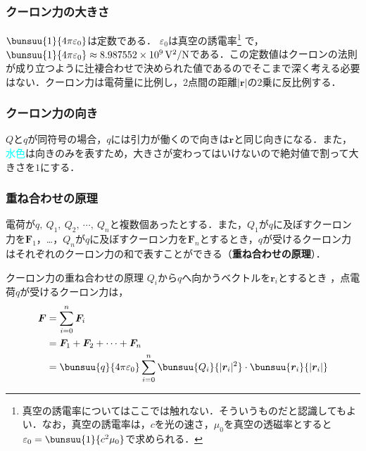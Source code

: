 \subsubsection*{クーロン力の大きさ}

$\bunsuu{1}{4\pi\varepsilon_0}$は定数である．
$\varepsilon_0$は真空の誘電率\footnote{真空の誘電率についてはここでは触れない．そういうものだと認識してもよい．なお，真空の誘電率は，$c$を光の速さ，$\mu_0$を真空の透磁率とすると$\varepsilon_0 = \bunsuu{1}{c^2\mu_0}$で求められる．} で，
$\bunsuu{1}{4\pi\varepsilon_0} \approx 8.987552 \times 10^9\, \mathrm{V^2 / N}$である．この定数値はクーロンの法則が成り立つように辻褄合わせで決められた値であるのでそこまで深く考える必要はない．クーロン力は電荷量に比例し，2点間の距離$|\bm{r}|$の2乗に反比例する．



\subsubsection*{クーロン力の向き}

$Q$と$q$が同符号の場合，$q$には引力が働くので向きは$\bm{r}$と同じ向きになる．また，\textcolor{cyan}{水色}は向きのみを表すため，大きさが変わってはいけないので絶対値で割って大きさを$1$にする．



\subsubsection*{重ね合わせの原理}

電荷が$q,\ Q_1,\ Q_2,\ \cdots,\ Q_n$と複数個あったとする．また，$Q_1$が$q$に及ぼすクーロン力を$\bm{F}_1$，…，$Q_n$が$q$に及ぼすクーロン力を$\bm{F}_n$とするとき，$q$が受けるクーロン力はそれぞれのクーロン力の和で表すことができる（\textbf{重ね合わせの原理}）．

\begin{kousiki}{クーロン力の重ね合わせの原理}
	$Q_i$から$q$へ向かうベクトルを$\bm{r}_i$とするとき
	，点電荷$q$が受けるクーロン力は，
	\begin{align}
		\bm{F} &= \sum_{i = 0}^{n} \bm{F}_i\\
			&= \bm{F}_1 + \bm{F}_2 + \cdots + \bm{F}_n \notag\\
			&= \bunsuu{q}{4\pi\varepsilon_0} \sum_{i = 0}^{n} \bunsuu{Q_i}{|\bm{r}_i|^2} \cdot \bunsuu{\bm{r}_i}{|\bm{r}_i|}
	\end{align}
\end{kousiki}

